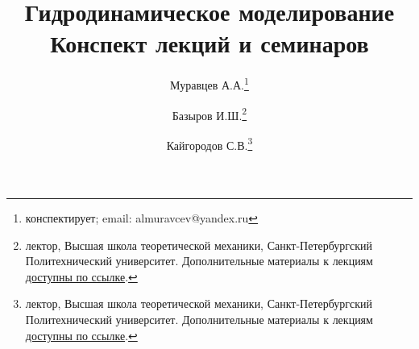 \documentclass[a4paper,12pt]{article}
\begin{document}
	
	\tableofcontents
	\title{Гидродинамическое моделирование\\Конспект лекций и семинаров}
	\author{Муравцев А.А.\thanks{конспектирует; email: almuravcev@yandex.ru}
	\and
	Базыров И.Ш.\thanks{лектор, Высшая школа теоретической механики, Санкт-Петербургский Политехнический университет. Дополнительные материалы к лекциям \href{https://csspbstu-my.sharepoint.com/:f:/g/personal/muravtsev_aa_edu_spbstu_ru/Epiacj6WFMBHqIF6E3YQgCMB7yi5NAA1ycqFLqrTZMhJ4w?e=i2agP0}{доступны по ссылке}.}
	\and
	Кайгородов С.В.\thanks{лектор, Высшая школа теоретической механики, Санкт-Петербургский Политехнический университет. Дополнительные материалы к лекциям \href{https://csspbstu-my.sharepoint.com/:f:/g/personal/muravtsev_aa_edu_spbstu_ru/Epiacj6WFMBHqIF6E3YQgCMB7yi5NAA1ycqFLqrTZMhJ4w?e=i2agP0}{доступны по ссылке}.}}
	\maketitle
	
	\newpage
	
	\newpage
	
	\newpage
	
	\newpage
	
	\newpage
	
	\newpage
	
	\newpage
	
	\newpage
	
	\newpage
	
	\newpage
	
	\newpage
	
	\newpage
	
	\newpage
	
	\newpage
	
	\newpage
	
	\newpage
	
	\newpage
	
	\newpage
	
	\newpage
	
	
\end{document}
